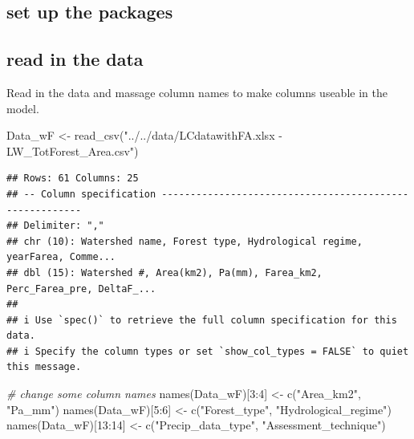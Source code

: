 \documentclass[]{elsarticle} %
\newenvironment{Shaded}{\begin{snugshade}}{\end{snugshade}}
\newcommand{\CommentTok}[1]{\textcolor[rgb]{0.56,0.35,0.01}{\textit{#1}}}
\newcommand{\DecValTok}[1]{\textcolor[rgb]{0.00,0.00,0.81}{#1}}
\newcommand{\FunctionTok}[1]{\textcolor[rgb]{0.00,0.00,0.00}{#1}}
\newcommand{\NormalTok}[1]{#1}
\newcommand{\OtherTok}[1]{\textcolor[rgb]{0.56,0.35,0.01}{#1}}
\newcommand{\SpecialCharTok}[1]{\textcolor[rgb]{0.00,0.00,0.00}{#1}}
\newcommand{\StringTok}[1]{\textcolor[rgb]{0.31,0.60,0.02}{#1}}
\begin{document}
\hypertarget{set-up-the-packages}{%
\subsection{set up the packages}\label{set-up-the-packages}}

\hypertarget{read-in-the-data}{%
\subsection{read in the data}\label{read-in-the-data}}

Read in the data and massage column names to make columns useable in the model.

\begin{Shaded}
\begin{Highlighting}[]
\NormalTok{Data\_wF }\OtherTok{\textless{}{-}} \FunctionTok{read\_csv}\NormalTok{(}\StringTok{"../../data/LCdatawithFA.xlsx {-} LW\_TotForest\_Area.csv"}\NormalTok{)}
\end{Highlighting}
\end{Shaded}

\begin{verbatim}
## Rows: 61 Columns: 25
## -- Column specification --------------------------------------------------------
## Delimiter: ","
## chr (10): Watershed name, Forest type, Hydrological regime, yearFarea, Comme...
## dbl (15): Watershed #, Area(km2), Pa(mm), Farea_km2, Perc_Farea_pre, DeltaF_...
## 
## i Use `spec()` to retrieve the full column specification for this data.
## i Specify the column types or set `show_col_types = FALSE` to quiet this message.
\end{verbatim}

\begin{Shaded}
\begin{Highlighting}[]
\CommentTok{\# change some column names}
\FunctionTok{names}\NormalTok{(Data\_wF)[}\DecValTok{3}\SpecialCharTok{:}\DecValTok{4}\NormalTok{] }\OtherTok{\textless{}{-}} \FunctionTok{c}\NormalTok{(}\StringTok{"Area\_km2"}\NormalTok{, }\StringTok{"Pa\_mm"}\NormalTok{)}
\FunctionTok{names}\NormalTok{(Data\_wF)[}\DecValTok{5}\SpecialCharTok{:}\DecValTok{6}\NormalTok{] }\OtherTok{\textless{}{-}} \FunctionTok{c}\NormalTok{(}\StringTok{"Forest\_type"}\NormalTok{, }\StringTok{"Hydrological\_regime"}\NormalTok{)}
\FunctionTok{names}\NormalTok{(Data\_wF)[}\DecValTok{13}\SpecialCharTok{:}\DecValTok{14}\NormalTok{] }\OtherTok{\textless{}{-}} \FunctionTok{c}\NormalTok{(}\StringTok{"Precip\_data\_type"}\NormalTok{, }\StringTok{"Assessment\_technique"}\NormalTok{)}
\end{Highlighting}
\end{Shaded}
\end{document}
